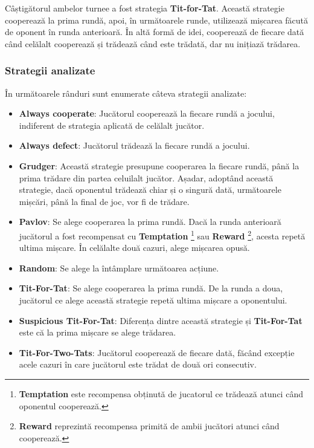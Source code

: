 Câștigătorul ambelor turnee a fost strategia \textbf{Tit-for-Tat}. Această strategie cooperează la prima rundă, apoi, în următoarele runde, utilizează mișcarea făcută de oponent în runda anterioară. În altă formă de idei, cooperează de fiecare dată când celălalt cooperează și trădează când este trădată, dar nu inițiază trădarea.

\clearpage

\subsubsection{Strategii analizate}

În următoarele rânduri sunt enumerate câteva strategii analizate:

\begin{itemize}  
	\item \textbf{Always cooperate}: Jucătorul cooperează la fiecare rundă a jocului, indiferent de strategia aplicată de celălalt jucător. 
	\item \textbf{Always defect}: Jucătorul trădează la fiecare rundă a jocului. 
	\item \textbf{Grudger}: Această strategie presupune cooperarea la fiecare rundă, până la prima trădare din partea celuilalt jucător. Așadar, adoptând această strategie, dacă oponentul trădează chiar și o singură dată, următoarele mișcări, până la final de joc, vor fi de trădare. 
	\item \textbf{Pavlov}: Se alege cooperarea la prima rundă. Dacă la runda anterioară jucătorul a fost recompensat cu \textbf{Temptation} \footnote{\textbf{Temptation} este recompensa obținută de jucatorul ce trădează atunci când oponentul cooperează.} sau \textbf{Reward} \footnote{\textbf{Reward} reprezintă recompensa primită de ambii jucători atunci când cooperează.}, acesta repetă ultima mișcare. În celălalte două cazuri, alege mișcarea opusă. 
	\item \textbf{Random}: Se alege la întâmplare următoarea acțiune. 
	\item \textbf{Tit-For-Tat}: Se alege cooperarea la prima rundă. De la runda a doua, jucătorul ce alege această strategie repetă ultima mișcare a oponentului. 
	\item \textbf{Suspicious Tit-For-Tat}: Diferența dintre această strategie și \textbf{Tit-For-Tat} este că la prima mișcare se alege trădarea. 
	\item \textbf{Tit-For-Two-Tats}:  Jucătorul cooperează de fiecare dată, făcând excepție acele cazuri în care jucătorul este trădat de două ori consecutiv. 
\end{itemize}  


